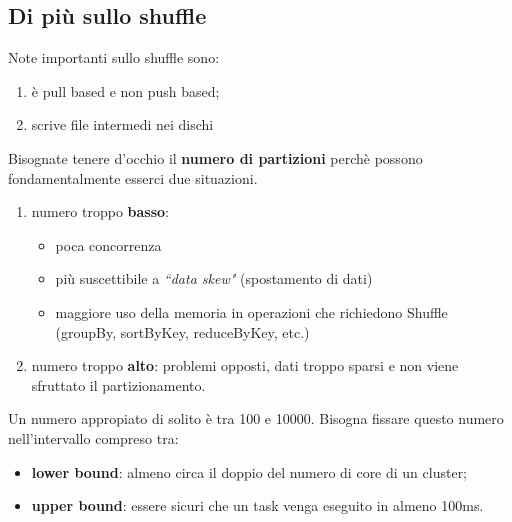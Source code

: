 \documentclass[12pt,italian]{article}
\begin{document}
\subsection{Di più sullo shuffle}
Note importanti sullo shuffle sono:
\begin{enumerate}
	\item è pull based e non push based;
	\item scrive file intermedi nei dischi
\end{enumerate}
Bisognate tenere d'occhio il \textbf{numero di partizioni} perchè possono fondamentalmente esserci due situazioni.
\begin{enumerate}
	\item numero troppo \textbf{basso}:
	\begin{itemize}
		\item poca concorrenza
		\item più suscettibile a \textit{``data skew"} (spostamento di dati)
		\item maggiore uso della memoria in operazioni che richiedono Shuffle (groupBy, sortByKey, reduceByKey, etc.)
	\end{itemize}
	\item numero troppo \textbf{alto}: problemi opposti, dati troppo sparsi e non viene sfruttato il partizionamento.
\end{enumerate}
Un numero appropiato di solito è tra 100 e 10000.
Bisogna fissare questo numero nell'intervallo compreso tra:
\begin{itemize}
	\item \textbf{lower bound}:  almeno circa il doppio del numero di core di un cluster;
	\item \textbf{upper bound}: essere sicuri che un task venga eseguito in almeno 100ms.
\end{itemize}

\end{document}
